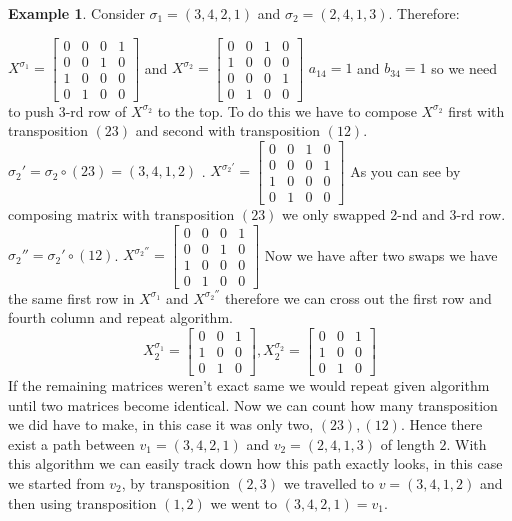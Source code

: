 \documentclass[11pt]{article}
\theoremstyle{plain}
\theoremstyle{definition}
\newtheorem{example}[thm]{Example}
\begin{document}
\begin{example}
    Consider $\sigma_1 = (3,4,2,1)$ and $\sigma_2 = (2,4,1,3)$. Therefore:
    
    $X^{\sigma_1} = \begin{bmatrix}
    0 & 0 & 0 & 1 \\ 0 & 0 & 1 & 0 \\ 1 & 0 & 0 & 0 \\ 0 & 1 & 0 & 0\end{bmatrix}$ and $X^{\sigma_2} = \begin{bmatrix}
    0 & 0 & 1 & 0 \\ 1 & 0 & 0 & 0 \\ 0 & 0 & 0 & 1 \\ 0 & 1 & 0 & 0\end{bmatrix}$
    $a_{14}=1$ and $b_{34} = 1$ so we need to push 3-rd row of $X^{\sigma_2}$ to the top. To do this we have to compose $X^{\sigma_2}$ first with transposition $(2 3)$ and second with transposition $(1 2)$. 
    $\sigma_2' = \sigma_2 \circ (2 3) = (3,4,1,2)$ . 
    $X^{\sigma_2'} = \begin{bmatrix}
        0 & 0 & 1 & 0 \\ 0 & 0 & 0 & 1 \\ 1 & 0 & 0 & 0 \\ 0 & 1 & 0 & 0
    \end{bmatrix}$
    As you can see by composing matrix with transposition $(2 3)$ we only swapped 2-nd and 3-rd row. 
      $\sigma_2'' = \sigma_2' \circ (1 2)$. 
    $X^{\sigma_2''} = \begin{bmatrix}
        0 & 0 & 0 & 1 \\ 0 & 0 & 1 & 0 \\ 1 & 0 & 0 & 0 \\ 0 & 1 & 0 & 0
    \end{bmatrix}$
    Now we have after two swaps we have the same first row in $X^{\sigma_1}$ and $X^{\sigma_2''}$ therefore we can cross out the first row and fourth column and repeat algorithm.
    $$ X^{\sigma_1}_2 = \begin{bmatrix}
     0 & 0 & 1  \\ 1 & 0 & 0  \\ 0 & 1 & 0 \end{bmatrix} , X^{\sigma_2}_2 = \begin{bmatrix}
    0 & 0 & 1  \\ 1 & 0 & 0  \\ 0 & 1 & 0 
    \end{bmatrix}$$
    If the remaining matrices weren't exact same we would repeat given algorithm until two matrices become identical. Now we can count how many transposition we did have to make, in this case it was only two, $(2 3),(1 2)$. Hence there exist a path between $v_1 = (3,4,2,1)$ and $v_2 = (2,4,1,3)$ of length $2$. With this algorithm we can easily track down how this path exactly looks, in this case we started from $v_2 $, by transposition $(2,3)$ we travelled to $v = (3,4,1,2)$ and then using transposition $(1,2)$ we went to $(3,4,2,1) = v_1$. 
  
\end{example}
\end{document}
